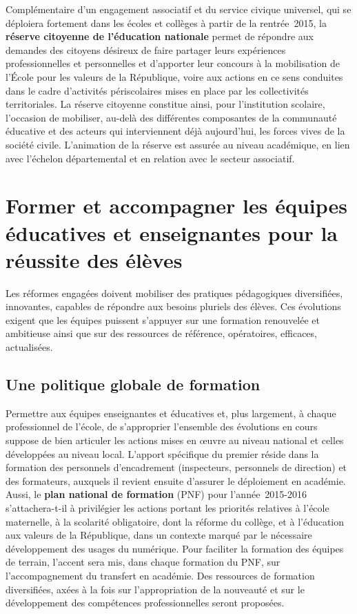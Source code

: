 Complémentaire d’un engagement associatif et du service civique universel, qui se déploiera fortement dans les écoles et collèges à partir de la rentrée~2015, la \textbf{réserve citoyenne de l’éducation nationale} permet de répondre aux demandes des citoyens désireux de faire partager leurs expériences professionnelles et personnelles et d’apporter leur concours à la mobilisation de l’École pour les valeurs de la République, voire aux actions en ce sens conduites dans le cadre d’activités périscolaires mises en place par les collectivités territoriales. La réserve citoyenne constitue ainsi, pour l’institution scolaire, l’occasion de mobiliser, au-delà des différentes composantes de la communauté éducative et des acteurs qui interviennent déjà aujourd’hui, les forces vives de la société civile. L’animation de la réserve est assurée au niveau académique, en lien avec l’échelon départemental et en relation avec le secteur associatif.

\section{Former et accompagner les équipes éducatives et enseignantes pour la réussite des élèves}
Les réformes engagées doivent mobiliser des pratiques pédagogiques diversifiées, innovantes, capables de répondre aux besoins pluriels des élèves. Ces évolutions exigent que les équipes puissent s’appuyer sur une formation renouvelée et ambitieuse ainsi que sur des ressources de référence, opératoires, efficaces, actualisées.

\subsection{Une politique globale de formation}
Permettre aux équipes enseignantes et éducatives et, plus largement, à chaque professionnel de l’école, de s’approprier l’ensemble des évolutions en cours suppose de bien articuler les actions mises en œuvre au niveau national et celles développées au niveau local. L’apport spécifique du premier réside dans la formation des personnels d’encadrement (inspecteurs, personnels de direction) et des formateurs, auxquels il revient ensuite d’assurer le déploiement en académie. Aussi, le \textbf{plan national de formation} (PNF) pour l’année~2015-2016 s’attachera-t-il à privilégier les actions portant les priorités relatives à l’école maternelle, à la scolarité obligatoire, dont la réforme du collège, et à l’éducation aux valeurs de la République, dans un contexte marqué par le nécessaire développement des usages du numérique. Pour faciliter la formation des équipes de terrain, l’accent sera mis, dans chaque formation du PNF, sur l’accompagnement du transfert en académie. Des ressources de formation diversifiées, axées à la fois sur l’appropriation de la nouveauté et sur le développement des compétences professionnelles seront proposées.

